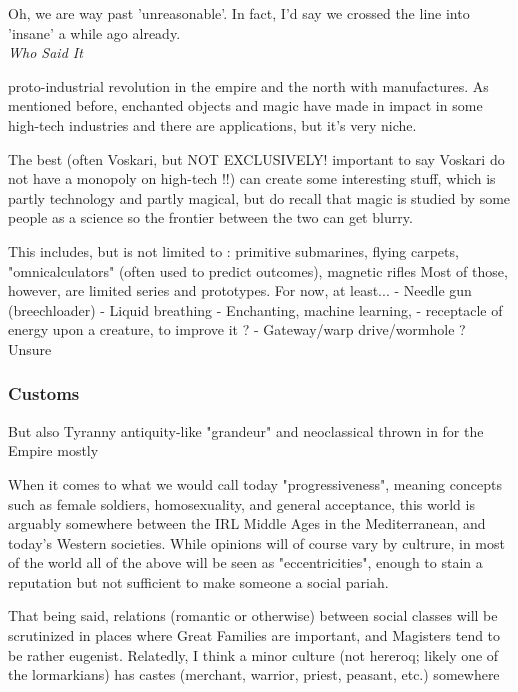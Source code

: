 \begin{rpg-quotebox}
    Oh, we are way past 'unreasonable'. In fact, I'd say we crossed the line into 'insane' a while ago already. \\ \textendash \textit{Who Said It}
\end{rpg-quotebox}

proto-industrial revolution in the empire and the north with manufactures. As mentioned before, enchanted objects and magic have made in impact in some high-tech industries and there are applications, but it's very niche.

The best (often Voskari, but NOT EXCLUSIVELY! important to say Voskari do not have a monopoly on high-tech !!) can create some interesting stuff, which is partly technology and partly magical, but do recall that magic is studied by some people as a science so the frontier between the two can get blurry.



This includes, but is not limited to : primitive submarines, flying carpets, "omnicalculators" (often used to predict outcomes), magnetic rifles
Most of those, however, are limited series and prototypes. For now, at least...
- Needle gun (breechloader)
- Liquid breathing
- Enchanting, machine learning, 
- receptacle of energy upon a creature, to improve it ?
- Gateway/warp drive/wormhole ? Unsure





\subsubsection{Customs}

But also Tyranny antiquity-like "grandeur" and neoclassical thrown in for the Empire mostly

When it comes to what we would call today "progressiveness", meaning concepts such as female soldiers, homosexuality, and general acceptance, this world is arguably somewhere between the IRL Middle Ages in the Mediterranean, and today's Western societies. While opinions will of course vary by cultrure, in most of the world all of the above will be seen as "eccentricities", enough to stain a reputation but not sufficient to make someone a social pariah.

That being said, relations (romantic or otherwise) between social classes will be scrutinized in places where Great Families are important, and Magisters tend to be rather eugenist. Relatedly, I think a minor culture (not hereroq; likely one of the lormarkians) has castes (merchant, warrior, priest, peasant, etc.) somewhere

